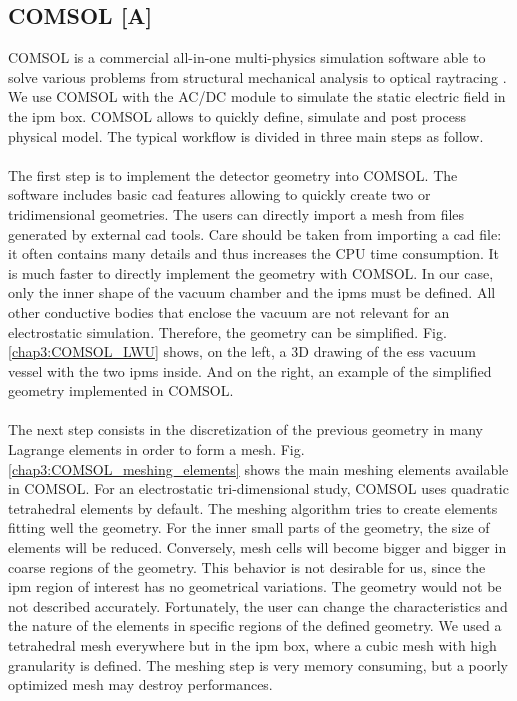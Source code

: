 \begin{refsection}
  \subsection{COMSOL [A]}
  COMSOL is a commercial all-in-one multi-physics simulation software able to solve various problems from structural mechanical analysis to optical raytracing \cite{comsol2018}. We use COMSOL with the AC/DC module \cite{comsolacdc2018} to simulate the static electric field in the \acrshort{ipm} box. COMSOL allows to quickly define, simulate and post process physical model. The typical workflow is divided in three main steps as follow.

  \paragraph{}
  The first step is to implement the detector geometry into COMSOL. The software includes basic \acrshort{cad} features allowing to quickly create two or tridimensional geometries. The users can directly import a mesh from files generated by external \acrshort{cad} tools. Care should be taken from importing a \acrshort{cad} file: it often contains many details and thus increases the CPU time consumption. It is much faster to directly implement the geometry with COMSOL.  In our case, only the inner shape of the vacuum chamber and the \acrshort{ipm}s must be defined. All other conductive bodies that enclose the vacuum are not relevant for an electrostatic simulation. Therefore, the geometry can be simplified. Fig. \ref{chap3:COMSOL_LWU} shows, on the left, a 3D drawing of the \acrshort{ess} vacuum vessel with the two \acrshort{ipm}s inside. And on the right, an example of the simplified geometry implemented in COMSOL.

  

  \paragraph{}
  The next step consists in the discretization of the previous geometry in many Lagrange elements in order to form a mesh. Fig. \ref{chap3:COMSOL_meshing_elements} shows the main meshing elements available in COMSOL. For an electrostatic tri-dimensional study, COMSOL uses quadratic tetrahedral elements by default. The meshing algorithm tries to create elements fitting well the geometry. For the inner small parts of the geometry, the size of elements will be reduced. Conversely, mesh cells will become bigger and bigger in coarse regions of the geometry. This behavior is not desirable for us, since the \acrshort{ipm} region of interest has no geometrical variations. The geometry would not be not described accurately. Fortunately, the user can change the characteristics and the nature of the elements in specific regions of the defined geometry. We used a tetrahedral mesh everywhere but in the \acrshort{ipm} box, where a cubic mesh with high granularity is defined. The meshing step is very memory consuming, but a poorly optimized mesh may destroy performances.


\end{refsection}
